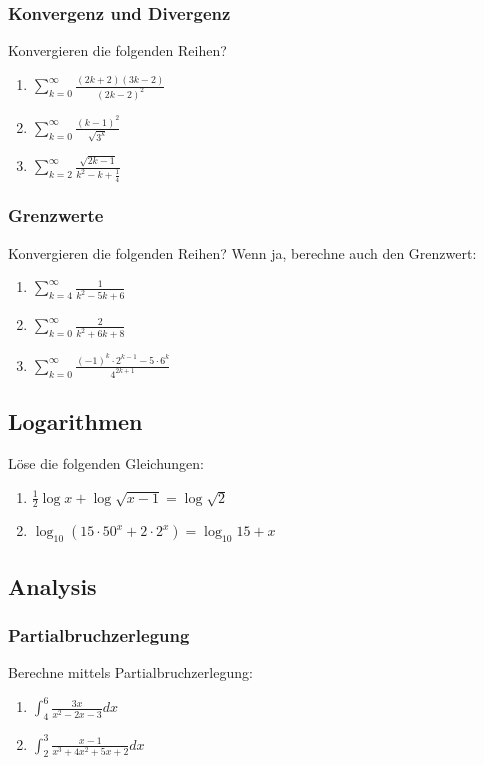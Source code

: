 \documentclass[11pt, a4paper]{article}
\begin{document}
\subsubsection{Konvergenz und Divergenz}
Konvergieren die folgenden Reihen?
\begin{enumerate}
	\item $\sum_{k=0}^\infty \frac{(2k+2)(3k-2)}{(2k-2)^2}$
	\item $\sum_{k=0}^\infty \frac{(k-1)^2}{\sqrt{3^k}}$
	\item $\sum_{k=2}^\infty \frac{\sqrt{2k-1}}{k^2-k+\frac{1}{4}}$
\end{enumerate}

\subsubsection{Grenzwerte}
Konvergieren die folgenden Reihen? Wenn ja, berechne auch den Grenzwert:
\begin{enumerate}
	\item $\sum_{k=4}^\infty \frac{1}{k^2-5k+6}$
	\item $\sum_{k=0}^\infty \frac{2}{k^2+6k+8}$
	\item $\sum_{k=0}^\infty \frac{(-1)^k \cdot 2^{k-1} - 5 \cdot 6^k}{4^{2k+1}}$
\end{enumerate}

\subsection{Logarithmen}
Löse die folgenden Gleichungen:
\begin{enumerate}
	\item $\frac{1}{2} \log x + \log \sqrt{x-1} = \log \sqrt{2}$
	\item $\log_{10} \left( 15 \cdot 50^x + 2 \cdot 2^x \right) = \log_{10} 15 + x$
\end{enumerate}

\subsection{Analysis}
\subsubsection{Partialbruchzerlegung}
Berechne mittels Partialbruchzerlegung:
\begin{enumerate}
	\item $\int_4^6 \frac{3x}{x^2 - 2x - 3} dx$ %
	\item $\int_2^3 \frac{x-1}{x^3 + 4x^2 + 5x + 2} dx$ %
\end{enumerate}
\end{document}
